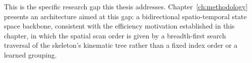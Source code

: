 This is the specific research gap this thesis addresses. Chapter~\ref{ch:methodology}
presents an architecture aimed at this gap: a bidirectional
spatio-temporal state space backbone, consistent with the efficiency
motivation established in this chapter, in which the spatial scan order is
given by a breadth-first search traversal of the skeleton's kinematic
tree rather than a fixed index order or a learned grouping.

\FloatBarrier


